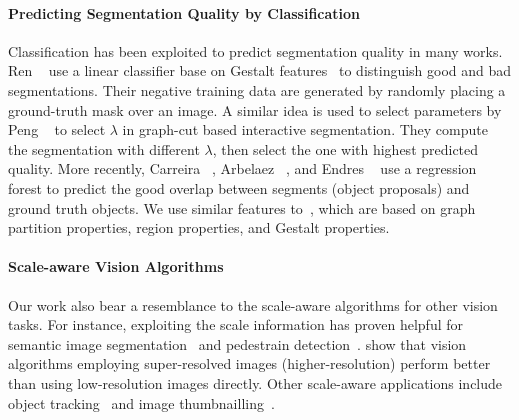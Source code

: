 
\paragraph{Predicting Segmentation Quality by Classification}
Classification has been exploited to predict segmentation quality in many works.
Ren \etal~\cite{ren2003learning} use a linear classifier base on Gestalt features~\cite{palmer1999vision}
to distinguish good and bad segmentations.
Their negative training data are generated by randomly placing a ground-truth mask over an image.
A similar idea is used to select parameters by Peng \etal~\cite{peng2008parameter} to select $\lambda$ in 
graph-cut based interactive segmentation.
They compute the segmentation with different $\lambda$, then select the one with highest predicted quality. 
More recently, Carreira \etal~\cite{carreira2010constrained}, Arbelaez \etal~\cite{arbelaez2014multiscale},
and Endres \etal~\cite{endres2014category} use a regression forest to predict the good overlap between
segments (object proposals) and ground truth objects.
We use similar features to~\cite{carreira2010constrained}, which are based on graph partition properties,
region properties, and Gestalt properties.

   
\paragraph{Scale-aware Vision Algorithms} 
Our work also bear a resemblance to the scale-aware algorithms for other vision tasks. 
For instance, exploiting the scale information has proven helpful for semantic image segmentation~\cite{chen2015attention} and 
pedestrain detection~\cite{li2015scale}. \cite{SR4VTs:wacv16} show that 
vision algorithms employing super-resolved images (higher-resolution) perform better than using low-resolution images directly.  
Other scale-aware applications include object tracking~\cite{Klodt2013} and image thumbnailling~\cite{Sun2013}.     
   
   
   
   
   
